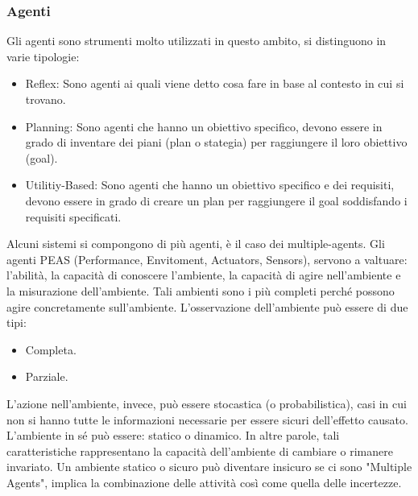 \newpage
{}
\subsubsection{Agenti}
Gli agenti sono strumenti molto utilizzati in questo ambito, si distinguono in varie tipologie:
\begin{itemize}
    \item Reflex: Sono agenti ai quali viene detto cosa fare in base al contesto in cui si trovano.
    \item Planning: Sono agenti che hanno un obiettivo specifico, devono essere in grado di inventare dei piani (plan o stategia) per raggiungere il loro obiettivo (goal).
    \item Utilitiy-Based: Sono agenti che hanno un obiettivo specifico e dei requisiti, devono essere in grado di creare un plan per raggiungere il goal soddisfando i requisiti specificati.
\end{itemize}
Alcuni sistemi si compongono di più agenti, è il caso dei multiple-agents.
Gli agenti PEAS (Performance, Envitoment, Actuators, Sensors), servono a valtuare: l'abilità, la capacità di conoscere l'ambiente, la capacità di agire nell'ambiente e la misurazione dell'ambiente.
Tali ambienti sono i più completi perché possono agire concretamente sull'ambiente.
L'osservazione dell'ambiente può essere di due tipi:
\begin{itemize}
    \item Completa. 
    \item Parziale.
\end{itemize}  
L'azione nell'ambiente, invece, può essere stocastica (o probabilistica), casi in cui non si hanno tutte le informazioni necessarie per essere sicuri dell'effetto causato.
L'ambiente in sé può essere: statico o dinamico. In altre parole, tali caratteristiche rappresentano la capacità dell'ambiente di cambiare o rimanere invariato.
Un ambiente statico o sicuro può diventare insicuro se ci sono "Multiple Agents", implica la combinazione delle attività così come quella delle incertezze.


\newpage
\newpage

